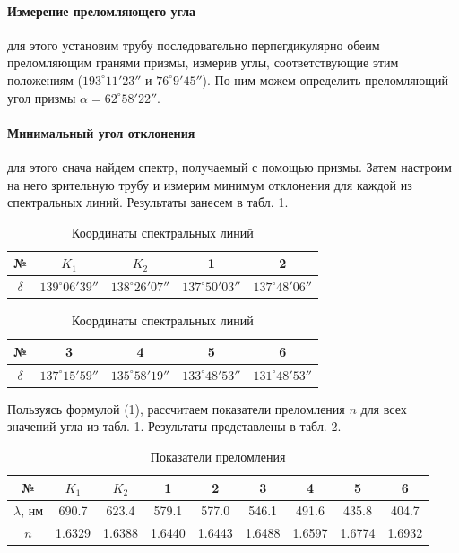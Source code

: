 \documentclass[a4paper,12pt]{article}
\begin{document}
\paragraph{Измерение преломляющего угла} для этого установим трубу последовательно перпегдикулярно обеим преломляющим гранями призмы, измерив углы, соответствующие этим положениям ($193^\circ11'23''$ и $76^\circ9'45''$). По ним можем определить преломляющий угол призмы $\alpha = 62^\circ58'22''$.

\paragraph{Минимальный угол отклонения} для этого снача найдем спектр, получаемый с помощью призмы. Затем настроим на него зрительную трубу и измерим минимум отклонения для каждой из спектральных линий. Результаты занесем в табл. 1.

\begin{table}[H]
    \centering
    \caption{Координаты спектральных линий}
    \begin{tabular}{|c|c|c|c|c|} \hline
         № & $K_1$ & $K_2$ & 1 & 2 \\ \hline
         $\delta$ & $139^\circ06'39''$ & $138^\circ26'07''$ & $137^\circ50'03''$ & $137^\circ48'06''$ \\ \hline
    \end{tabular}
    \begin{tabular}{|c|c|c|c|c|} \hline
         № & 3 & 4 & 5 & 6 \\ \hline
         $\delta$ & $137^\circ15'59''$ & $135^\circ58'19''$ & $133^\circ48'53''$ & $131^\circ48'53''$ \\ \hline
    \end{tabular}
\end{table}

\noindent
Пользуясь формулой (1), рассчитаем показатели преломления $n$ для всех значений угла из табл. 1. Результаты представлены в табл. 2.

\begin{table}[H]
    \centering
    \caption{Показатели преломления}
    \begin{tabular}{|c|c|c|c|c|c|c|c|c|} \hline
         № & $K_1$ & $K_2$ & 1 & 2 & 3 & 4 & 5 & 6 \\ \hline
         $\lambda$, нм & 690.7 & 623.4 & 579.1 & 577.0 & 546.1 & 491.6 & 435.8 & 404.7 \\ \hline
         $n$ & 1.6329 & 1.6388 & 1.6440 & 1.6443 & 1.6488 & 1.6597 & 1.6774 & 1.6932 \\ \hline
    \end{tabular}
\end{table}
\end{document}
